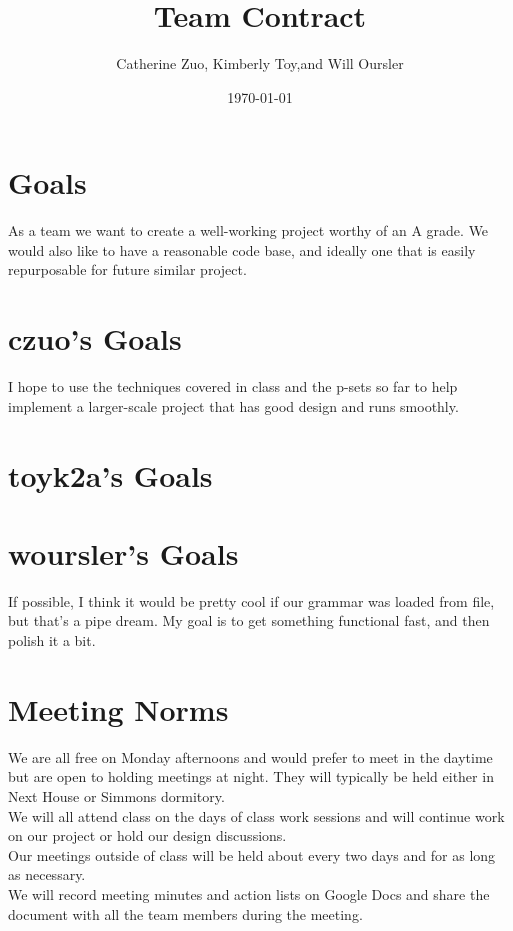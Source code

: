 

\author{ Catherine Zuo, Kimberly Toy,and Will Oursler} 
\address{ MIT, Cambridge, MA }
\title{Team Contract}
\date{\today}
\maketitle

\section{ Goals }
As a team we want to create a well-working project worthy of an A grade. We would also like to have a reasonable code base, and ideally one that is easily repurposable for future similar project.

\section{ czuo's Goals }
I hope to use the techniques covered in class and the p-sets so far to help implement a larger-scale project that has good design and runs smoothly.  
\section{ toyk2a's Goals }
\section{ woursler's Goals }
If possible, I think it would be pretty cool if our grammar was loaded from file, but that's a pipe dream. My goal is to get something functional fast, and then polish it a bit.

\section{Meeting Norms}
We are all free on Monday afternoons and would prefer to meet in the daytime but are open to holding meetings at night.  They will typically be held either in Next House or Simmons dormitory.  
\newline
\\We will all attend class on the days of class work sessions and will continue work on our project or hold our design discussions.  
\newline
\\Our meetings outside of class will be held about every two days and for as long as necessary.  
\newline
\\We will record meeting minutes and action lists on Google Docs and share the document with all the team members during the meeting.  

